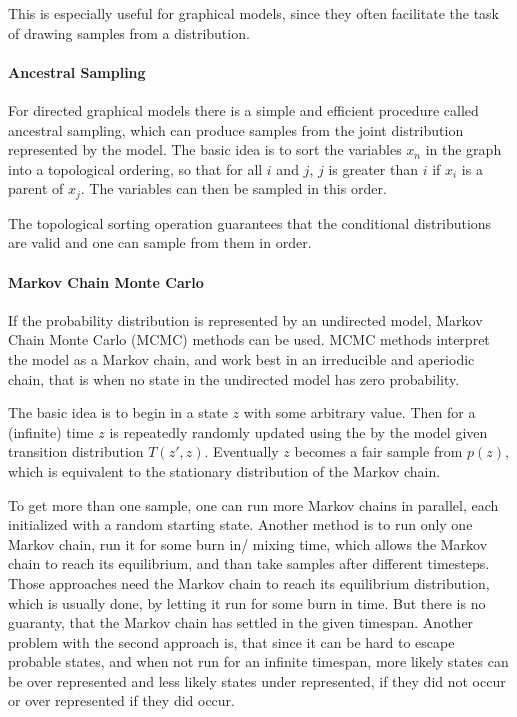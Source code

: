 This is especially useful for graphical models, since they often facilitate the task of drawing samples from a distribution.

\paragraph{Ancestral Sampling} For directed graphical models there is a simple and efficient procedure called ancestral sampling, which can produce samples from the joint distribution represented by the model. 
The basic idea is to sort the variables $x_n$ in the graph into a topological ordering, so that for all $i$ and $j$, $j$ is greater than $i$ if $x_i$ is a parent of $x_j$. The variables can then be sampled in this order.

The topological sorting operation guarantees that the conditional distributions are valid and one can sample from them in order.

\paragraph{Markov Chain Monte Carlo} If the probability distribution is represented by an undirected model, Markov Chain Monte Carlo (MCMC) methods can be used. 
MCMC methods interpret the model as a Markov chain, and work best in an irreducible and aperiodic chain, that is when no state in the undirected model has zero probability.

The basic idea is to begin in a state $z$ with some arbitrary value. 
Then for a (infinite) time $z$ is repeatedly randomly updated using the by the model given transition distribution $T(z',z)$. 
Eventually $z$ becomes a fair sample from $p(z)$, which is equivalent to the stationary distribution of the Markov chain.

To get more than one sample, one can run more Markov chains in parallel, each initialized with a random starting state. 
Another method is to run only one Markov chain, run it for some burn in/ mixing time, which allows the Markov chain to reach its equilibrium, and than take samples after different timesteps.
Those approaches need the Markov chain to reach its equilibrium distribution, which is usually done, by letting it run for some burn in time.
But there is no guaranty, that the Markov chain has settled in the given timespan.    
Another problem with the second approach is, that since it can be hard to escape probable states, and when not run for an infinite timespan, more likely states can be over represented and less likely states under represented, if they did not occur or over represented if they did occur.  

